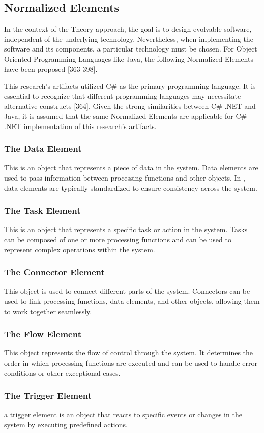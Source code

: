 \subsection{Normalized Elements} \label{subsec_ns_elements} 

In the context of the \ns Theory approach, the goal is to design evolvable software,
independent of the underlying technology. Nevertheless, when implementing the software and
its components, a particular technology must be chosen. For Object Oriented Programming
Languages like Java, the following Normalized Elements have been proposed
\parencite{mannaert_normalized_2016}[363-398].

This research's artifacts utilized C\# as the primary programming language. It is essential
to recognize that different programming languages may necessitate alternative constructs
\parencite{mannaert_normalized_2016}[364]. Given the strong similarities between C\# .NET
and Java, it is assumed that the same Normalized Elements are applicable for C\# .NET
implementation of this research's artifacts.

\subsubsection{The Data Element}
This is an object that represents a piece of data in the system. Data elements are used to
pass information between processing functions and other objects. In \ns,
data elements are typically standardized to ensure consistency across the system.

\subsubsection{The Task Element}
This is an object that represents a specific task or action in the system. Tasks can be
composed of one or more processing functions and can be used to represent complex
operations within the system.

\subsubsection{The Connector Element}
This object is used to connect different parts of the system. Connectors can be
used to link processing functions, data elements, and other objects, allowing them to work
together seamlessly.

\subsubsection{The Flow Element}
This object represents the flow of control through the system. It determines the order in
which processing functions are executed and can be used to handle error conditions or
other exceptional cases.

\subsubsection{The Trigger Element}
a trigger element is an object that reacts to specific events or changes in the system
by executing predefined actions.